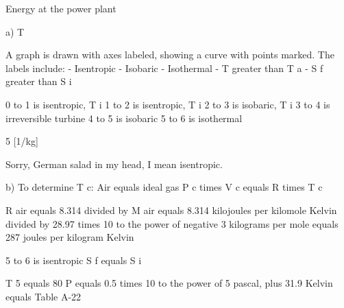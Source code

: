 Energy at the power plant

a) T

A graph is drawn with axes labeled, showing a curve with points marked. The labels include:
- Isentropic
- Isobaric
- Isothermal
- T greater than T a
- S f greater than S i

0 to 1 is isentropic, T i
1 to 2 is isentropic, T i
2 to 3 is isobaric, T i
3 to 4 is irreversible turbine
4 to 5 is isobaric
5 to 6 is isothermal

5 [1/kg]

Sorry, German salad in my head, I mean isentropic.

b) To determine T c:
Air equals ideal gas
P c times V c equals R times T c

R air equals 8.314 divided by M air equals 8.314 kilojoules per kilomole Kelvin divided by 28.97 times 10 to the power of negative 3 kilograms per mole equals 287 joules per kilogram Kelvin

5 to 6 is isentropic
S f equals S i

T 5 equals 80
P equals 0.5 times 10 to the power of 5 pascal, plus 31.9 Kelvin equals Table A-22